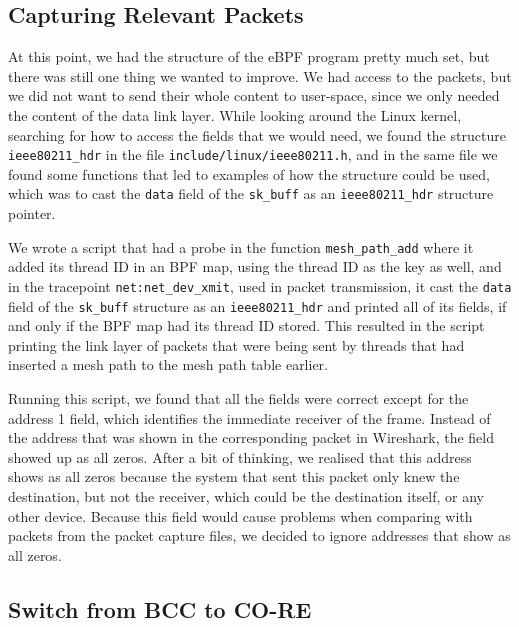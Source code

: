 


\subsection{Capturing Relevant Packets}

At this point, we had the structure of the eBPF program pretty much set, but
there was still one thing we wanted to improve. We had access to the packets,
but we did not want to send their whole content to user-space, since we only
needed the content of the data link layer. While looking around the Linux
kernel, searching for how to access the fields that we would need, we found the
structure \texttt{ieee80211\_hdr} in the file
\texttt{include/linux/ieee80211.h}, and in the same file we found some functions
that led to examples of how the structure could be used, which was to cast the
\texttt{data} field of the \texttt{sk\_buff} as an \texttt{ieee80211\_hdr}
structure pointer.

We wrote a script that had a probe in the function \texttt{mesh\_path\_add}
where it added its thread ID in an BPF map, using the thread ID as the key as
well, and in the tracepoint \texttt{net:net\_dev\_xmit}, used in packet
transmission, it cast the \texttt{data} field of the \texttt{sk\_buff} structure
as an \texttt{ieee80211\_hdr} and printed all of its fields, if and only if the
BPF map had its thread ID stored. This resulted in the script printing the link
layer of packets that were being sent by threads that had inserted a mesh path
to the mesh path table earlier.

Running this script, we found that all the fields were correct except for the
address 1 field, which identifies the immediate receiver of the frame. Instead
of the address that was shown in the corresponding packet in Wireshark, the
field showed up as all zeros. After a bit of thinking, we realised that this
address shows as all zeros because the system that sent this packet only knew
the destination, but not the receiver, which could be the destination itself, or
any other device. Because this field would cause problems when comparing with
packets from the packet capture files, we decided to ignore addresses that show
as all zeros.


\subsection{Switch from BCC to CO-RE}\label{subs:switch}

